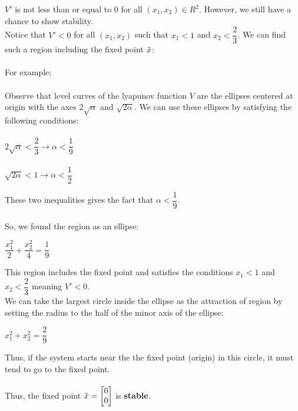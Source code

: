 \documentclass[12pt,a4paper, margin=1in]{article}
\begin{document}
\begin{enumerate}
\begin{enumerate}
            $V'$ is not less than or equal to 0 for all $(x_1,x_2) \in R^2$. However, we still have a chance to show stability.
\\

            Notice that $V' < 0$ for all $(x_1,x_2)$ such that $x_1 < 1$ and $x_2 < \dfrac{2}{3}$.  We can find such a region including the fixed point $\Tilde{x}$:
\\ \\
            For example; \\ \\
            Observe that level curves of the lyapunov function $V$ are the ellipses centered at origin with the axes
            $2\sqrt{\alpha}$ and $\sqrt{2\alpha}$. We can use these ellipses by satisfying the following conditions:
            \\\\

             $2\sqrt{\alpha} < \dfrac{2}{3} \longrightarrow \alpha < \dfrac{1}{9}$ \\ \\ 
             $\sqrt{2\alpha} < 1 \longrightarrow \alpha < \dfrac{1}{2}$

            These two inequalities gives the fact that  $\alpha < \dfrac{1}{9}$. \\\\

            So, we found the region as an ellipse:
            \begin{center}
                $\dfrac{x_1^2}{2} + \dfrac{x_2^2}{4} = \dfrac{1}{9}$
            \end{center}

            This region includes the fixed point and satisfies the conditions $x_1 < 1$ and $x_2 < \dfrac{2}{3}$ meaning $V' < 0$.  \\
            
            We can take the largest circle inside the ellipse as the attraction of region by setting the radius to the half of the minor axis of the ellipse: 
            \begin{center}
                $x_1^2 + x_2^2 = \dfrac{2}{9}$
            \end{center}
            
            
            Thus, if the system starts near the the fixed point (origin) in this circle, it must tend to go to the fixed point. \\ \\
            Thus, the fixed point $\Tilde{x} = \begin{bmatrix}
                0 \\ 0
            \end{bmatrix}$ is \textbf{stable}. 
    

\end{enumerate}
\end{enumerate}
\end{document}
